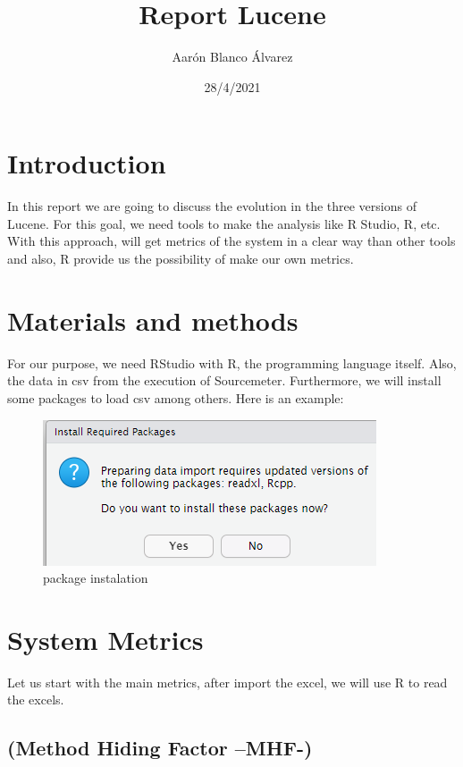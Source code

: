 \documentclass[
]{article}
\title{Report Lucene}
\author{Aarón Blanco Álvarez}
\date{28/4/2021}
\begin{document}
\maketitle

\hypertarget{introduction}{%
\section{Introduction}\label{introduction}}

In this report we are going to discuss the evolution in the three
versions of Lucene. For this goal, we need tools to make the analysis
like R Studio, R, etc. With this approach, will get metrics of the
system in a clear way than other tools and also, R provide us the
possibility of make our own metrics.

\hypertarget{materials-and-methods}{%
\section{Materials and methods}\label{materials-and-methods}}

For our purpose, we need RStudio with R, the programming language
itself. Also, the data in csv from the execution of Sourcemeter.
Furthermore, we will install some packages to load csv among others.
Here is an example:

\begin{figure}
\centering
\includegraphics{EXCEL.png}
\caption{package instalation}
\end{figure}

\hypertarget{system-metrics}{%
\section{System Metrics}\label{system-metrics}}

Let us start with the main metrics, after import the excel, we will use
R to read the excels.

\hypertarget{method-hiding-factor-mhf-}{%
\subsection{(Method Hiding Factor
--MHF-)}\label{method-hiding-factor-mhf-}}
\end{document}

